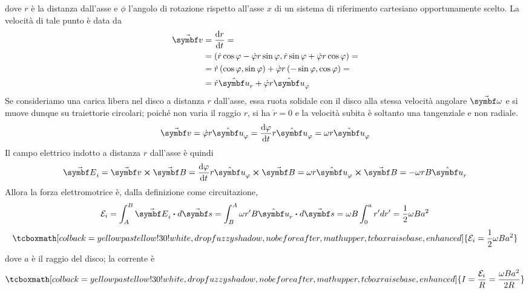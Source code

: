 dove $r$ è la distanza dall'asse e $\phi$ l'angolo di rotazione rispetto all'asse $x$ di un sistema di riferimento cartesiano opportunamente scelto. La velocità di tale punto è data da
\begin{align*}
	\vba{v}&=\dv{r}{t}=\\
	&=\left(\dot{r}\cos\phi-\dot{\phi}r\sin\phi,\dot{r}\sin\phi+\dot{\phi}r\cos\phi\right)=\\
	&=\dot{r}\left(\cos\phi,\sin\phi\right)+\dot{\phi}r\left(-\sin\phi,\cos\phi\right)=\\
	&=\dot{r}\vbh{u}_r+\dot{\phi}r\vbh{u}_{\phi}
\end{align*}
Se consideriamo una carica libera nel disco a distanza $r$ dall'asse, essa ruota solidale con il disco alla stessa velocità angolare $\vba{\omega}$ e si muove dunque su traiettorie circolari; poiché non varia il raggio $r$, si ha $\dot{r}=0$ e la velocità subita è soltanto una tangenziale e non radiale.
\begin{equation*}
	\vba{v}=\dot{\phi}r\vbh{u}_{\phi}=\dv{\phi}{t}r\vbh{u}_{\phi}=\omega r\vbh{u}_{\phi}
\end{equation*}
Il campo elettrico indotto a distanza $r$ dall'asse è quindi
\begin{equation*}
	\vba{E}_i=\vba{v}\cross\vba{B}=\dv{\phi}{t}r\vbh{u}_{\phi}\cross\vba{B}=\omega r\vbh{u}_{\phi}\cross\vba{B}=-\omega r B\vbh{u}_r
\end{equation*}
Allora la forza elettromotrice è, dalla definizione come circuitazione, 
\begin{equation*}
	\mathcal{E}_i=\int_{A}^{B}\vba{E}_i\vdot d\vba{s}=\int_{B}^{A}\omega r' B\vbh{u}_r\vdot d\vba{s}=\omega B\int_0^a r'dr'=\frac{1}{2}\omega Ba^2
\end{equation*}
\begin{equation}
	\tcboxmath[colback=yellowpastellow!30!white,drop fuzzy shadow, nobeforeafter, math upper, tcbox raise base, enhanced]{\mathcal{E}_i=\frac{1}{2}\omega Ba^2}
\end{equation}
dove $a$ è il raggio del disco; la corrente è
\begin{equation}
	\tcboxmath[colback=yellowpastellow!30!white,drop fuzzy shadow, nobeforeafter, math upper, tcbox raise base, enhanced]{I=\frac{\mathcal{E}_i}{R}=\frac{\omega B a^2}{2R}}
\end{equation}
